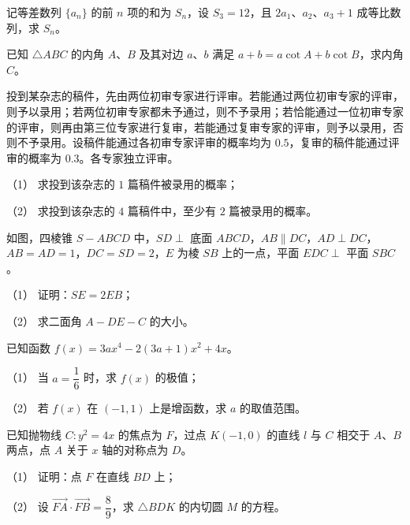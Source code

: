 \begin{question}
记等差数列 $\{a_n\}$ 的前 $n$ 项的和为 $S_n$，设 $S_3=12$，且 $2a_1\text{、}a_2\text{、}a_3+1$ 成等比数列，求 $S_n$。

\end{question}
\begin{question}
已知 $\triangle ABC$ 的内角 $A\text{、}B$ 及其对边 $a\text{、}b$ 满足 $a+b=a\cot A+b\cot B$，求内角 $C$。

\end{question}
\begin{question}
投到某杂志的稿件，先由两位初审专家进行评审。若能通过两位初审专家的评审，则予以录用；若两位初审专家都未予通过，则不予录用；若恰能通过一位初审专家的评审，则再由第三位专家进行复审，若能通过复审专家的评审，则予以录用，否则不予录用。设稿件能通过各初审专家评审的概率均为 $0.5$，复审的稿件能通过评审的概率为 $0.3$。各专家独立评审。

（1） 求投到该杂志的 $1$ 篇稿件被录用的概率；

（2） 求投到该杂志的 $4$ 篇稿件中，至少有 $2$ 篇被录用的概率。

\Needspace{0.4\textheight}
\end{question}
\begin{question}
如图，四棱锥 $S-ABCD$ 中，$SD\perp$ 底面 $ABCD$，$AB\parallel DC$，$AD\perp DC$，$AB=AD=1$，$DC=SD=2$，$E$ 为棱 $SB$ 上的一点，平面 $EDC\perp$ 平面 $SBC$。
\nopagebreak[4]
\begin{center}\end{center}
\nopagebreak[4]
（1） 证明：$SE=2EB$；

（2） 求二面角 $A-DE-C$ 的大小。

\end{question}
\begin{question}
已知函数 $f(x)=3ax^4-2(3a+1)x^2+4x$。

（1） 当 $a=\dfrac16$ 时，求 $f(x)$ 的极值；

（2） 若 $f(x)$ 在 $(-1,1)$ 上是增函数，求 $a$ 的取值范围。

\end{question}
\begin{question}
已知抛物线 $C:y^2=4x$ 的焦点为 $F$，过点 $K(-1,0)$ 的直线 $l$ 与 $C$ 相交于 $A\text{、}B$ 两点，点 $A$ 关于 $x$ 轴的对称点为 $D$。

（1） 证明：点 $F$ 在直线 $BD$ 上；

（2） 设 $\overrightarrow{FA}\cdot\overrightarrow{FB}=\dfrac89$，求 $\triangle BDK$ 的内切圆 $M$ 的方程。

\end{question}